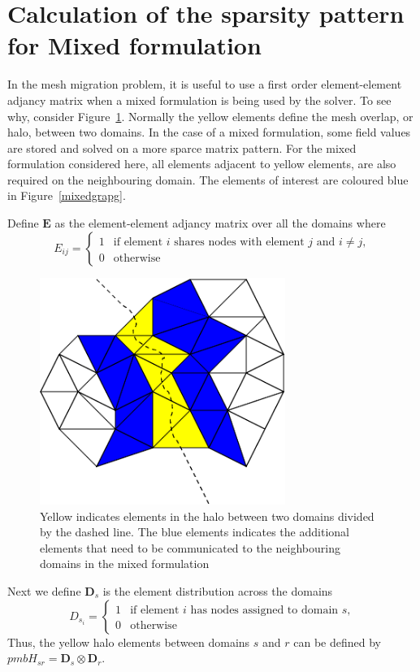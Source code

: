 \documentclass[11pt]{article}
\begin{document}
	
\section{Calculation of the sparsity pattern for Mixed formulation}
	
In the mesh migration problem, it is useful to use a first order
element-element adjancy matrix when a mixed formulation is being used
by the solver. To see why, consider
Figure~\ref{fig:mixedgraph}. Normally the yellow elements define the
mesh overlap, or halo, between two domains. In the case of a mixed
formulation, some field values are stored and solved on a more sparce
matrix pattern. For the mixed formulation considered here, all
elements adjacent to yellow elements, are also required on the
neighbouring domain. The elements of interest are coloured blue in
Figure~\ref{mixedgrapg}. 

Define $\pmb{E}$ as the element-element adjancy matrix over all the
domains where
\begin{displaymath}
E_{ij} = \left\{ \begin{array}{ll}
1 & \textrm{if element $i$ shares nodes with element $j$ and $i \ne j$,}\\
0 & \textrm{otherwise}
\end{array} \right.
\end{displaymath}

\begin{figure}[h]\label{fig:mixedgraph}
\centering
\includegraphics[width=80mm]{images/mixed}
\caption{Yellow indicates elements in the halo between two domains
divided by the dashed line. The blue elements indicates the additional
elements that need to be communicated to the neighbouring domains in
the mixed formulation}
\end{figure} 

Next we define $\pmb{D}_s$ is the element distribution across the domains
\begin{displaymath}
D_{s_i} = \left\{ \begin{array}{ll}
1 & \textrm{if element $i$ has nodes assigned to domain $s$,}\\
0 & \textrm{otherwise}
\end{array} \right.
\end{displaymath}
Thus, the yellow halo elements between domains $s$ and $r$ can be
defined by $pmb{H}_{sr} = \pmb{D}_s \otimes \pmb{D}_r$. 
\end{document}
